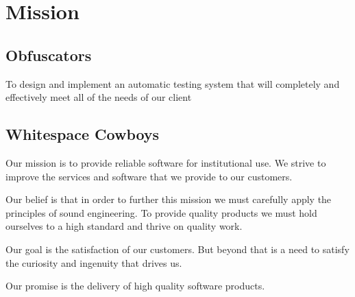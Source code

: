 
\chapter{Mission}

\section{Obfuscators}

To design and implement an automatic testing system that will completely and effectively meet all of the needs of our client

\section{Whitespace Cowboys}
Our mission is to provide reliable software for institutional use. We strive to improve the services and software that we provide to our customers.

Our belief is that in order to further this mission we must carefully apply the principles of sound engineering. To provide quality products we must hold ourselves to a high standard and thrive on quality work.

Our goal is the satisfaction of our customers. But beyond that is a need to satisfy the curiosity and ingenuity that drives us.

Our promise is the delivery of high quality software products.
